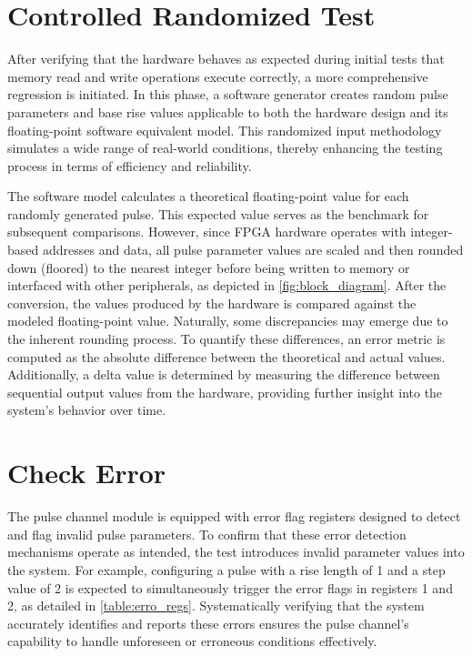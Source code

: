 \section{Controlled Randomized Test}

After verifying that the hardware behaves as expected during initial tests that memory read and write operations execute correctly, a more comprehensive regression is initiated. In this phase, a software generator creates random pulse parameters and base rise values applicable to both the hardware design and its floating-point software equivalent model. This randomized input methodology simulates a wide range of real-world conditions, thereby enhancing the testing process in terms of efficiency and reliability.

The software model calculates a theoretical floating-point value for each randomly generated pulse. This expected value serves as the benchmark for subsequent comparisons. However, since FPGA hardware operates with integer-based addresses and data, all pulse parameter values are scaled and then rounded down (floored) to the nearest integer before being written to memory or interfaced with other peripherals, as depicted in \autoref{fig:block_diagram}. After the conversion, the values produced by the hardware is compared against the modeled floating-point value. Naturally, some discrepancies may emerge due to the inherent rounding process. To quantify these differences, an error metric is computed as the absolute difference between the theoretical and actual values. Additionally, a delta value is determined by measuring the difference between sequential output values from the hardware, providing further insight into the system's behavior over time. 

\section{Check Error}

The pulse channel module is equipped with error flag registers designed to detect and flag invalid pulse parameters. To confirm that these error detection mechanisms operate as intended, the test introduces invalid parameter values into the system. For example, configuring a pulse with a rise length of 1 and a step value of 2 is expected to simultaneously trigger the error flags in registers 1 and 2, as detailed in \autoref{table:erro_regs}. Systematically verifying that the system accurately identifies and reports these errors ensures the pulse channel's capability to handle unforeseen or erroneous conditions effectively. 
